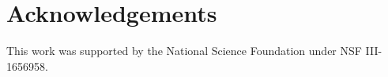 \section{Acknowledgements}

This work was supported by the National Science Foundation under NSF III-1656958.